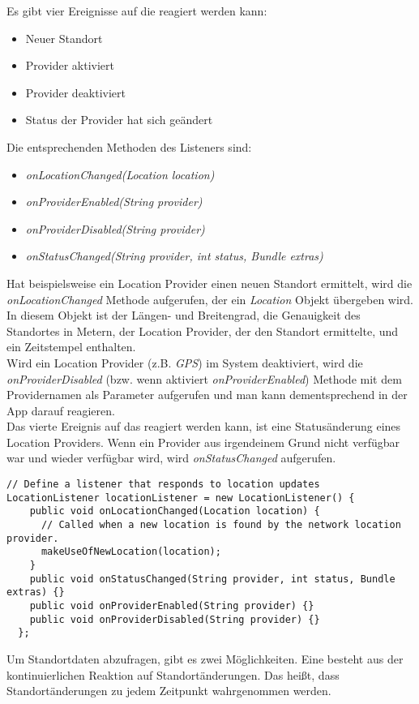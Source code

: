 Es gibt vier Ereignisse auf die reagiert werden kann:
\begin{itemize}
     \item Neuer Standort
     \item Provider aktiviert
     \item Provider deaktiviert
     \item Status der Provider hat sich geändert
\end{itemize}
Die entsprechenden Methoden des Listeners sind:
\begin{itemize}
     \item \textit{onLocationChanged(Location location)}
     \item \textit{onProviderEnabled(String provider)}
     \item \textit{onProviderDisabled(String provider)}
     \item \textit{onStatusChanged(String provider, int status, Bundle extras)}
\end{itemize}
Hat beispielsweise ein Location Provider einen neuen Standort ermittelt, wird die \textit{onLocationChanged} Methode aufgerufen, der ein \textit{Location} Objekt übergeben wird. In diesem Objekt ist der Längen- und Breitengrad, die Genauigkeit des Standortes in Metern, der Location Provider, der den Standort ermittelte, und ein Zeitstempel enthalten. 
\\
Wird ein Location Provider (z.B. \textit{GPS}) im System deaktiviert, wird die \textit{onProviderDisabled} (bzw. wenn aktiviert \textit{onProviderEnabled}) Methode mit dem Providernamen als Parameter aufgerufen und man kann dementsprechend in der App darauf reagieren. 
\\
Das vierte Ereignis auf das reagiert werden kann, ist eine Statusänderung eines Location Providers. Wenn ein Provider aus irgendeinem Grund nicht verfügbar war und wieder verfügbar wird, wird \textit{onStatusChanged} aufgerufen.
\newpage
\begin{lstlisting}[caption={LocationListener},label=lst:locationListener]
// Define a listener that responds to location updates
LocationListener locationListener = new LocationListener() {
    public void onLocationChanged(Location location) {
      // Called when a new location is found by the network location provider.
      makeUseOfNewLocation(location);
    }
    public void onStatusChanged(String provider, int status, Bundle extras) {}
    public void onProviderEnabled(String provider) {}
    public void onProviderDisabled(String provider) {}
  };
\end{lstlisting}
\bigskip
Um Standortdaten abzufragen, gibt es zwei Möglichkeiten. 
Eine besteht aus der kontinuierlichen Reaktion auf Standortänderungen. Das heißt, dass Standortänderungen zu jedem Zeitpunkt wahrgenommen werden.

